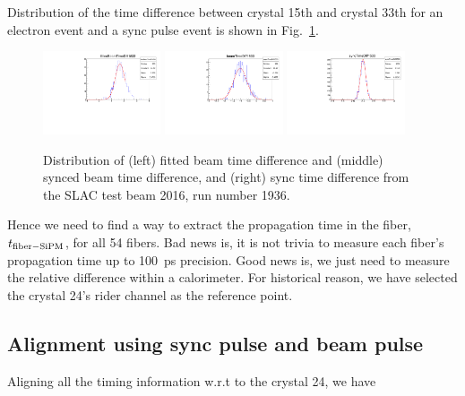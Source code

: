 Distribution of the time difference between crystal 15th and crystal 33th for an electron event and a sync pulse event is shown in Fig.~\ref{fig:DiffTiming_run1936}.
\begin{figure}[htbp]
\centering
\includegraphics[width=0.31\textwidth]{pics/fittedBeamTimeDiff1533.pdf} 
\includegraphics[width=0.31\textwidth]{pics/beamTimeDiff1533.pdf} \includegraphics[width=0.31\textwidth]{pics/syncTimeDiff1533.pdf}
\caption{Distribution of (left) fitted beam time difference and (middle) synced beam time difference, and (right) sync time difference from the SLAC test beam 2016, run number 1936.}\label{fig:DiffTiming_run1936}
\end{figure}

Hence we need to find a way to extract the propagation time in the fiber, $t_{\rm{fiber-SiPM}}$, for all 54 fibers. Bad news is, it is not trivia to measure each fiber's propagation time up to 100~ps precision. Good news is, we just need to measure the relative difference within a calorimeter. For historical reason,
we have selected the crystal 24's rider channel as the reference point.

\subsection*{Alignment using sync pulse and beam pulse}

Aligning all the timing information w.r.t to the crystal 24, we have


